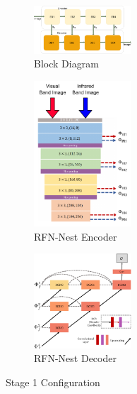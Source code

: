 \begin{figure}[htbp]
    \centering
    \begin{subfigure}[b]{\textwidth}
        \includegraphics[width=0.4\textwidth]{imgs/stage1.pdf}
        \captionsetup{justification=raggedright,singlelinecheck=false}
        \caption{Block Diagram}
        \label{fig:ch3:stage1}
    \end{subfigure}
    \vspace{0.01cm}
    \begin{subfigure}[b]{\textwidth}
        \includegraphics[width=0.4\textwidth]{imgs/encoder.pdf}
        \captionsetup{justification=raggedright,singlelinecheck=false}
        \caption{RFN-Nest \cite{li2021rfn} Encoder}
        \label{fig:ch3:encoder}
    \end{subfigure}
    \vspace{0.01cm}
    \begin{subfigure}[b]{\textwidth}
        \includegraphics[width=0.4\textwidth]{imgs/decoder.png}
        \captionsetup{justification=raggedright,singlelinecheck=false}
        \caption{RFN-Nest \cite{li2021rfn} Decoder}
        \label{fig:ch3:decoder}
    \end{subfigure} 
    \caption{Stage 1 Configuration}
    \label{fig:ch3:stage1all}
\end{figure}


